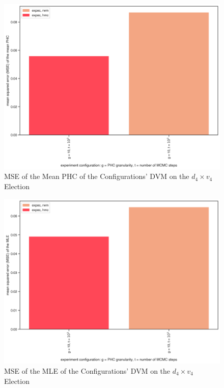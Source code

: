 \begin{figure}[ht]\centering
 \includegraphics[width=\linewidth]{figures/4_4_mean_mse.png}
 \caption{MSE of the Mean PHC of the Configurations' DVM on the $d_4 \times v_4$ Election}
 \label{fig:4_4_mean_mse}
\end{figure}

\begin{figure}[ht]\centering
 \includegraphics[width=\linewidth]{figures/4_4_mle_mse.png}
 \caption{MSE of the MLE of the Configurations' DVM on the $d_4 \times v_4$ Election}
 \label{fig:4_4_mle_mse}
\end{figure}
